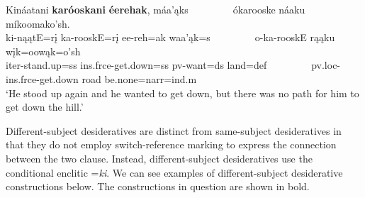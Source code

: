 \begin{exe}
\begin{xlist}
        \item\label{Ch5DesiderativesE} \glll Kináatani \textbf{karóoskani} \textbf{éerehak}, máa'ąks ~ ~ ~ ~ ~ ókarooske náaku míkoomako'sh.\\
        ki-nąątE=rį ka-rooskE=rį ee-reh=ak waa'ąk=s ~ ~ ~ ~ ~ o-ka-rooskE rąąku wįk=oowąk=o'sh\\
        iter-\textnormal{stand.up}=ss ins.frce-\textnormal{get.down}=ss pv-\textnormal{want}=ds \textnormal{land}=def ~ ~ ~ ~ ~ pv.loc-ins.frce-\textnormal{get.down} \textnormal{road} \textnormal{be.none}=narr=ind.m\\
        \glt `He stood up again and he wanted to get down, but there was no path for him to get down the hill.' \citep[210]{hollow1973a}
    \end{xlist}
\end{exe}

Different-subject desideratives are distinct from same-subject desideratives in that they do not employ switch-reference marking to express the connection between the two clause. Instead, different-subject desideratives use the conditional enclitic =\textit{ki}. We can see examples of different-subject desiderative constructions below. The constructions in question are shown in bold.


